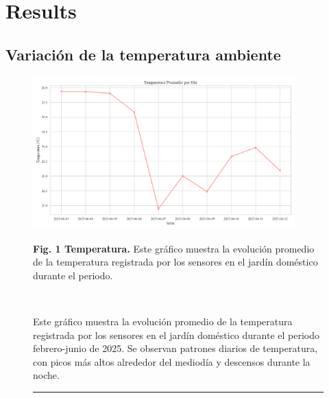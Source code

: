 \documentclass[pdflatex,sn-mathphys-num]{sn-jnl}%
\theoremstyle{thmstyleone}%
\theoremstyle{thmstyletwo}%
\theoremstyle{thmstylethree}%
\begin{document}
\section{Results}\label{sec2}

\subsection{Variación de la temperatura ambiente}





\begin{figure}[!ht]
    \centering
    \includegraphics[width=0.9\textwidth]{assets/temperatura_promedio.png}

    \vspace{0.4cm}

    \noindent
    \begin{minipage}[t]{0.5\textwidth}
        \raggedright
        \textbf{Fig. 1 Temperatura.} Este gráfico muestra la evolución promedio de la temperatura registrada por los sensores en el jardín doméstico durante el periodo.

        \
    \end{minipage}%
    \hfill
    \begin{minipage}[t]{0.5\textwidth}
        \justifying
        Este gráfico muestra la evolución promedio de la temperatura registrada por los sensores en el jardín doméstico durante el periodo febrero-junio de 2025. Se observan patrones diarios de temperatura, con picos más altos alrededor del mediodía y descensos durante la noche.
    \end{minipage}

    \vspace{0.5cm}
    \hrule
\end{figure}
\end{document}
